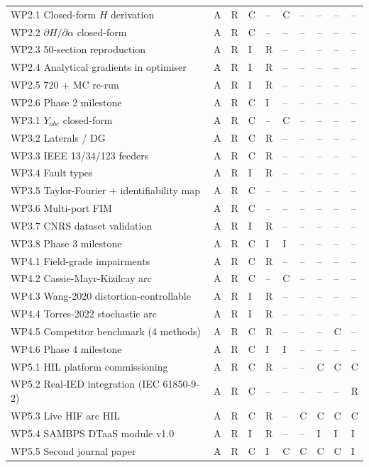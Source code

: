 \documentclass[11pt,a4paper]{article}
\begin{document}
\begin{longtable}{L{6.0cm} *{9}{C{0.7cm}}}
WP2.1 Closed-form $H$ derivation             & A & R & C & -- & C & -- & -- & -- & --\\
WP2.2 $\partial H/\partial\alpha$ closed-form & A & R & C & -- & -- & -- & -- & -- & --\\
WP2.3 50-section reproduction                & A & R & I & R & -- & -- & -- & -- & --\\
WP2.4 Analytical gradients in optimiser      & A & R & I & R & -- & -- & -- & -- & --\\
WP2.5 720 + MC re-run                        & A & R & I & R & -- & -- & -- & -- & --\\
WP2.6 Phase 2 milestone                      & A & R & C & I & -- & -- & -- & -- & --\\
WP3.1 $Y_{abc}$ closed-form                  & A & R & C & -- & C & -- & -- & -- & --\\
WP3.2 Laterals / DG                          & A & R & C & R & -- & -- & -- & -- & --\\
WP3.3 IEEE 13/34/123 feeders                 & A & R & C & R & -- & -- & -- & -- & --\\
WP3.4 Fault types                            & A & R & I & R & -- & -- & -- & -- & --\\
WP3.5 Taylor-Fourier + identifiability map   & A & R & C & -- & -- & -- & -- & -- & --\\
WP3.6 Multi-port FIM                         & A & R & C & -- & -- & -- & -- & -- & --\\
WP3.7 CNRS dataset validation                & A & R & I & R & -- & -- & -- & -- & --\\
WP3.8 Phase 3 milestone                      & A & R & C & I & I & -- & -- & -- & --\\
WP4.1 Field-grade impairments                & A & R & C & R & -- & -- & -- & -- & --\\
WP4.2 Cassie-Mayr-Kizilcay arc               & A & R & C & -- & C & -- & -- & -- & --\\
WP4.3 Wang-2020 distortion-controllable      & A & R & I & R & -- & -- & -- & -- & --\\
WP4.4 Torres-2022 stochastic arc             & A & R & I & R & -- & -- & -- & -- & --\\
WP4.5 Competitor benchmark (4 methods)       & A & R & C & R & -- & -- & -- & C & --\\
WP4.6 Phase 4 milestone                      & A & R & C & I & I & -- & -- & -- & --\\
WP5.1 HIL platform commissioning             & A & R & C & R & -- & -- & C & C & C\\
WP5.2 Real-IED integration (IEC 61850-9-2)   & A & R & C & -- & -- & -- & -- & -- & R\\
WP5.3 Live HIF arc HIL                       & A & R & C & R & -- & C & C & C & C\\
WP5.4 SAMBPS DTaaS module v1.0               & A & R & I & R & -- & -- & I & I & I\\
WP5.5 Second journal paper                   & A & R & C & I & C & C & C & C & I\\
\bottomrule
\end{longtable}
\end{document}
